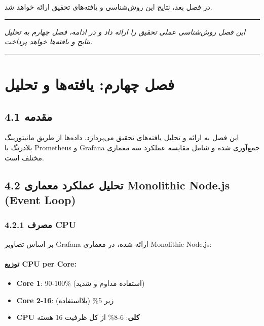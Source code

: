 \documentclass[
]{article}
\providecommand{\tightlist}{%
  \setlength{\itemsep}{0pt}\setlength{\parskip}{0pt}}
\begin{document}
در فصل بعد، نتایج این روش‌شناسی و یافته‌های تحقیق ارائه خواهد شد.

\begin{center}\rule{0.5\linewidth}{0.5pt}\end{center}

\emph{این فصل روش‌شناسی عملی تحقیق را ارائه داد و در ادامه، فصل چهارم به
تحلیل نتایج و یافته‌ها خواهد پرداخت.}

\begin{center}\rule{0.5\linewidth}{0.5pt}\end{center}

\section{فصل چهارم: یافته‌ها و
تحلیل}\label{ux641ux635ux644-ux686ux647ux627ux631ux645-ux6ccux627ux641ux62aux647ux647ux627-ux648-ux62aux62dux644ux6ccux644}

\subsection{4.1 مقدمه}\label{ux645ux642ux62fux645ux647-2}

این فصل به ارائه و تحلیل یافته‌های تحقیق می‌پردازد. داده‌ها از طریق
مانیتورینگ بلادرنگ با Prometheus و Grafana جمع‌آوری شده و شامل مقایسه
عملکرد سه معماری مختلف است.

\subsection{4.2 تحلیل عملکرد معماری Monolithic Node.js (Event
Loop)}\label{ux62aux62dux644ux6ccux644-ux639ux645ux644ux6a9ux631ux62f-ux645ux639ux645ux627ux631ux6cc-monolithic-node.js-event-loop}

\subsubsection{4.2.1 مصرف CPU}\label{ux645ux635ux631ux641-cpu}

بر اساس تصاویر Grafana ارائه شده، در معماری Monolithic Node.js:

\paragraph{توزیع CPU per
Core:}\label{ux62aux648ux632ux6ccux639-cpu-per-core}

\begin{itemize}
\tightlist
\item
  \textbf{Core 1}: 90-100\% (استفاده مداوم و شدید)
\item
  \textbf{Core 2-16}: زیر 5\% (بلااستفاده)
\item
  \textbf{CPU کلی}: 6-8\% از کل ظرفیت 16 هسته
\end{itemize}
\end{document}
